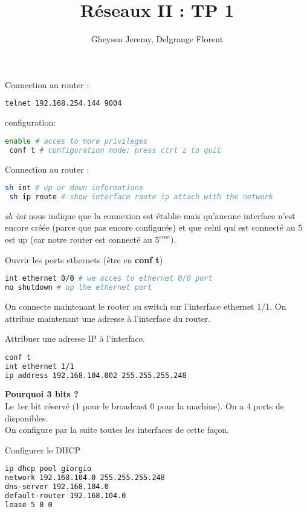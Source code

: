 \documentclass[10pt,a4paper]{article}
\author{Gheysen Jeremy, Delgrange Florent}
\title{Réseaux II : TP 1}
\begin{document}
\maketitle
\noindent Connection au router :
\begin{lstlisting}[language=bash]
 telnet 192.168.254.144 9004
\end{lstlisting}

\noindent configuration:
\begin{lstlisting}[language=bash]
 enable # acces to more privileges
 conf t # configuration mode; press ctrl z to quit 
\end{lstlisting}

\noindent Connection au router :
\begin{lstlisting}[language=bash]
 sh int # up or down informations
 sh ip route # show interface route ip attach with the network
\end{lstlisting}

\textit{sh int} nous indique que la connexion est établie mais qu'aucune interface n'est encore créée (parce que pas encore configurée) et que celui qui est connecté au $5$ est up (car notre router est connecté au $5^{eme}$).

\noindent Ouvrir les ports ethernets (être en \textbf{conf t})
\begin{lstlisting}[language=bash]
int ethernet 0/0 # we acces to ethernet 0/0 port
no shutdown # up the ethernet port
\end{lstlisting}

On connecte maintenant le rooter au switch sur l'interface ethernet 1/1. On attribue maintenant une adresse à l'interface du router.

\noindent Attribuer une adresse IP à l'interface.
\begin{lstlisting}[language=bash]
conf t
int ethernet 1/1
ip address 192.168.104.002 255.255.255.248
\end{lstlisting}
\textbf{Pourquoi 3 bits ?}\\
Le 1er bit réservé (1 pour le broadcast 0 pour la machine). On a 4 ports de disponibles.\\
On configure par la suite toutes les interfaces de cette façon.

\noindent Configurer le DHCP
\begin{lstlisting}[language=bash]
ip dhcp pool giorgio
network 192.168.104.0 255.255.255.248
dns-server 192.168.104.0
default-router 192.168.104.0
lease 5 0 0
\end{lstlisting}
\end{document}
